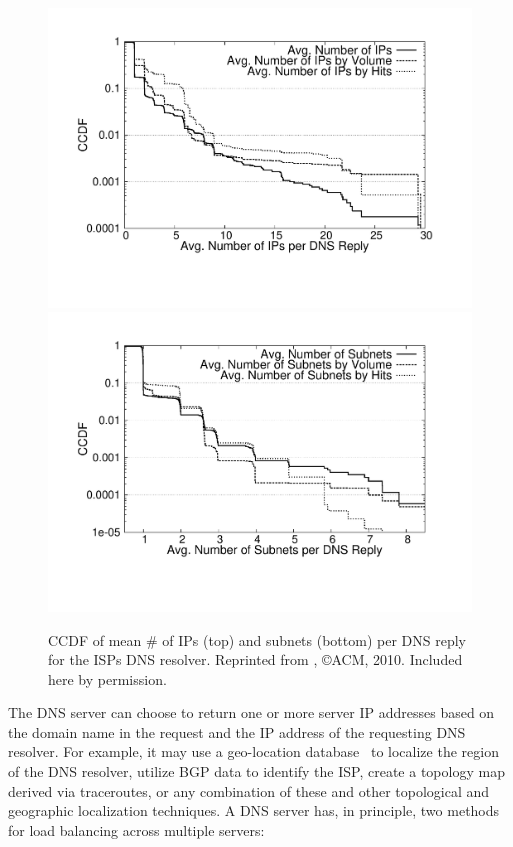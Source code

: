 \begin{figure}[htbp]
   \center
   \includegraphics[height=0.7\linewidth]{figures-pdf/avgResponseSize}\\
   \includegraphics[height=0.7\linewidth]{figures-pdf/avgResponseSubnetSize}

  \caption{CCDF of mean \# of IPs (top) and subnets (bottom) per DNS reply for the ISPs DNS resolver. Reprinted from \cite{PADIS2010}, \copyright ACM, 2010. Included here by permission.}
  \label{fig:CDF-AVG-REPLY-IPs}
\end{figure}

The DNS server can choose to return one or more server IP addresses based on
the domain name in the request and the IP address of the requesting DNS
resolver. For example, it may use a geo-location database~\cite{MaxMind} to
localize the region of the DNS resolver, utilize BGP data to identify the ISP,
create a topology map derived via traceroutes, or any combination of these and
other topological and geographic localization techniques. A DNS server has, in
principle, two methods for load balancing across multiple servers:

